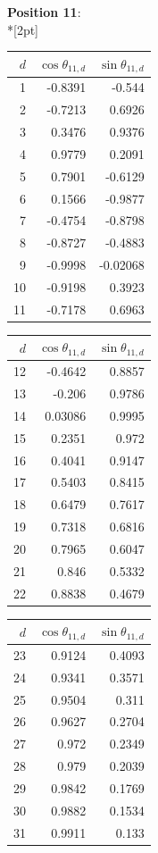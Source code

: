 \noindent \textbf{Position 11}:\\*[2pt]
{\tablefont \begin{tabular}[t]{r|rr}
$d$ & $\cos\theta_{11,d}$ & $\sin\theta_{11,d}$ \\\hline
1 & -0.8391 & -0.544 \\
2 & -0.7213 & 0.6926 \\
3 & 0.3476 & 0.9376 \\
4 & 0.9779 & 0.2091 \\
5 & 0.7901 & -0.6129 \\
6 & 0.1566 & -0.9877 \\
7 & -0.4754 & -0.8798 \\
8 & -0.8727 & -0.4883 \\
9 & -0.9998 & -0.02068 \\
10 & -0.9198 & 0.3923 \\
11 & -0.7178 & 0.6963
\end{tabular}\kern4pt
\begin{tabular}[t]{r|rr}
$d$ & $\cos\theta_{11,d}$ & $\sin\theta_{11,d}$ \\\hline
12 & -0.4642 & 0.8857 \\
13 & -0.206 & 0.9786 \\
14 & 0.03086 & 0.9995 \\
15 & 0.2351 & 0.972 \\
16 & 0.4041 & 0.9147 \\
17 & 0.5403 & 0.8415 \\
18 & 0.6479 & 0.7617 \\
19 & 0.7318 & 0.6816 \\
20 & 0.7965 & 0.6047 \\
21 & 0.846 & 0.5332 \\
22 & 0.8838 & 0.4679
\end{tabular}\kern4pt
\begin{tabular}[t]{r|rr}
$d$ & $\cos\theta_{11,d}$ & $\sin\theta_{11,d}$ \\\hline
23 & 0.9124 & 0.4093 \\
24 & 0.9341 & 0.3571 \\
25 & 0.9504 & 0.311 \\
26 & 0.9627 & 0.2704 \\
27 & 0.972 & 0.2349 \\
28 & 0.979 & 0.2039 \\
29 & 0.9842 & 0.1769 \\
30 & 0.9882 & 0.1534 \\
31 & 0.9911 & 0.133 \\

\end{tabular}}

